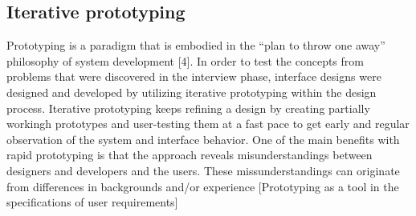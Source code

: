 \subsection{Iterative prototyping}
Prototyping is a paradigm that is embodied in the “plan to throw one
away” philosophy of system development [4].
In order to test the concepts from problems that were discovered in the interview phase, interface designs were designed and developed by utilizing iterative prototyping within the design process. Iterative prototyping keeps refining a design by creating partially workingh prototypes and user-testing them at a fast pace to get early and regular observation of the system and interface behavior. One of the main benefits with rapid prototyping is that the approach reveals misunderstandings between
designers and developers and the users. These missunderstandings can originate from
 differences in backgrounds and/or experience
[Prototyping as
a tool in the specifications of user requirements]
